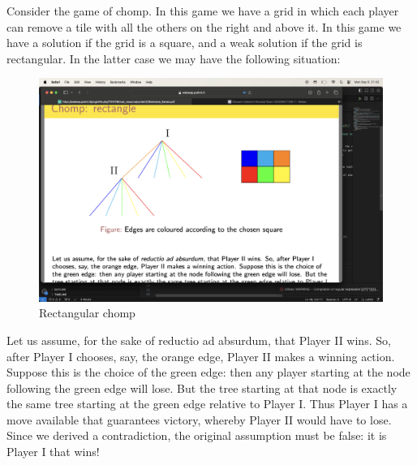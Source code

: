 \begin{example}
    Consider the game of chomp.
    In this game we have a grid in which each player can remove a tile with all the others on the right and above it. 
    In this game we have a solution if the grid is a square, and a weak solution if the grid is rectangular.
    In the latter case we may have the following situation: 
    \begin{figure}[H]
        \centering
        \includegraphics[width=0.75\linewidth]{images/chomp.png}
        \caption{Rectangular chomp}
    \end{figure}
    Let us assume, for the sake of reductio ad absurdum, that Player II wins. So, after Player I
    chooses, say, the orange edge, Player II makes a winning action. Suppose this is the choice of
    the green edge: then any player starting at the node following the green edge will lose. But the
    tree starting at that node is exactly the same tree starting at the green edge relative to Player I.
    Thus Player I has a move available that guarantees victory, whereby Player II would have to lose.
    Since we derived a contradiction, the original assumption must be false: it is Player I that wins!
\end{example}







